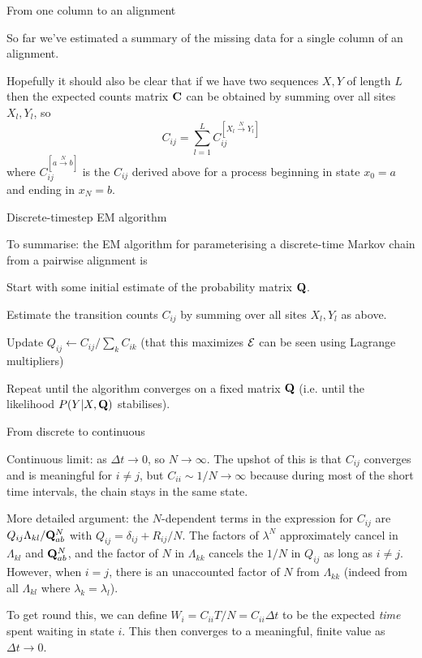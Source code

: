 \documentclass{beamer}
\begin{document}
\begin{frame}{From one column to an alignment}

So far we've estimated a summary of the missing data for a single column of an alignment.

Hopefully it should also be clear that if we have two sequences $X,Y$ of length $L$ then the expected counts matrix ${\bf C}$
can be obtained by summing over all sites $X_l,Y_l$, so
\[
C_{ij} = \sum_{l=1}^L C_{ij}^{[X_l \stackrel{N}{\to} Y_l]}
\]
where $C_{ij}^{[a \stackrel{N}{\to} b]}$ is the $C_{ij}$ derived above for a process beginning in state $x_0=a$ and ending in $x_N=b$.
\end{frame}

\begin{frame}{Discrete-timestep EM algorithm}
 \itemb
 \item To summarise: the EM algorithm for parameterising a discrete-time Markov chain from a pairwise alignment is
  \enumb
  \item Start with some initial estimate of the probability matrix ${\bf Q}$.
  \item Estimate the transition counts $C_{ij}$ by summing over all sites $X_l,Y_l$ as above.
  \item Update $Q_{ij} \leftarrow C_{ij} / \sum_k C_{ik}$ (that this maximizes ${\cal E}$ can be seen using Lagrange multipliers)
  \item Repeat until the algorithm converges on a fixed matrix ${\bf Q}$ (i.e. until the likelihood $P(Y|X,{\bf Q})$ stabilises).
  \enume
\iteme
\end{frame}

\begin{frame}{From discrete to continuous}
 \itemb
\item Continuous limit: as $\Delta t \to 0$, so $N \to \infty$.
The upshot of this is that $C_{ij}$ converges and is meaningful for $i \neq j$, but $C_{ii} \sim 1/N \to \infty$
because during most of the short time intervals, the chain stays in the same state.
 \itemb
 \item More detailed argument: the $N$-dependent terms in the expression for $C_{ij}$
are $Q_{ij} \Lambda_{kl} / {\bf Q}^N_{ab}$
with $Q_{ij} = \delta_{ij} + R_{ij}/N$.
The factors of $\lambda^N$ approximately cancel in $\Lambda_{kl}$ and ${\bf Q}^N_{ab}$,
and the factor of $N$ in $\Lambda_{kk}$ cancels the $1/N$ in $Q_{ij}$ as long as $i \neq j$.
However, when $i=j$, there is an unaccounted factor of $N$ from $\Lambda_{kk}$
(indeed from all $\Lambda_{kl}$ where $\lambda_k = \lambda_l$).
 \item To get round this, we can define $W_i = C_{ii} T/N = C_{ii} \Delta t$ to be the expected {\em time} spent waiting in state $i$.
This then converges to a meaningful, finite value as $\Delta t \to 0$.
\iteme
\iteme
\end{frame}
\end{document}
